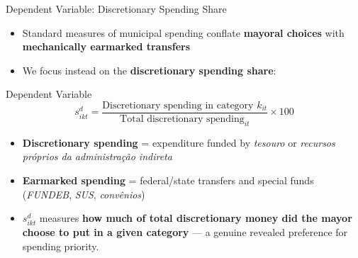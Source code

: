 \documentclass{beamer}
\begin{document}
\begin{frame}{Dependent Variable: Discretionary Spending Share}
\begin{itemize}
    \item Standard measures of municipal spending conflate \textbf{mayoral choices} with \textbf{mechanically earmarked transfers}
    \vspace{0.5em}
    \item We focus instead on the \textbf{discretionary spending share}:
\end{itemize}
\vspace{0.5em}
\begin{block}{Dependent Variable}
\begin{equation*}
    s^{d}_{ikt} = \frac{\text{Discretionary spending in category } k_{it}}{\text{Total discretionary spending}_{it}} \times 100
\end{equation*}
\end{block}
\vspace{0.5em}
\begin{itemize}
    \item \textbf{Discretionary spending} = expenditure funded by \textit{tesouro} or \textit{recursos próprios da administração indireta}
    \item \textbf{Earmarked spending} = federal/state transfers and special funds (\textit{FUNDEB}, \textit{SUS}, \textit{convênios})
    \vspace{0.5em}
    \item $s^{d}_{ikt}$ measures \textbf{how much of total discretionary money did the mayor choose to put in a given category} --- a genuine revealed preference for spending priority.
\end{itemize}
\end{frame}
\end{document}
